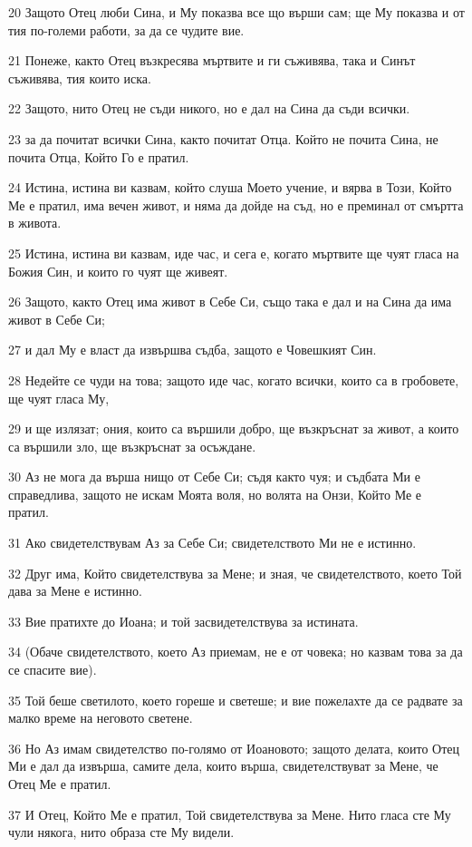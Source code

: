 \par 20 Защото Отец люби Сина, и Му показва все що върши сам; ще Му показва и от тия по-големи работи, за да се чудите вие.
\par 21 Понеже, както Отец възкресява мъртвите и ги съживява, така и Синът съживява, тия които иска.
\par 22 Защото, нито Отец не съди никого, но е дал на Сина да съди всички.
\par 23 за да почитат всички Сина, както почитат Отца. Който не почита Сина, не почита Отца, Който Го е пратил.
\par 24 Истина, истина ви казвам, който слуша Моето учение, и вярва в Този, Който Ме е пратил, има вечен живот, и няма да дойде на съд, но е преминал от смъртта в живота.
\par 25 Истина, истина ви казвам, иде час, и сега е, когато мъртвите ще чуят гласа на Божия Син, и които го чуят ще живеят.
\par 26 Защото, както Отец има живот в Себе Си, също така е дал и на Сина да има живот в Себе Си;
\par 27 и дал Му е власт да извършва съдба, защото е Човешкият Син.
\par 28 Недейте се чуди на това; защото иде час, когато всички, които са в гробовете, ще чуят гласа Му,
\par 29 и ще излязат; ония, които са вършили добро, ще възкръснат за живот, а които са вършили зло, ще възкръснат за осъждане.
\par 30 Аз не мога да върша нищо от Себе Си; съдя както чуя; и съдбата Ми е справедлива, защото не искам Моята воля, но волята на Онзи, Който Ме е пратил.
\par 31 Ако свидетелствувам Аз за Себе Си; свидетелството Ми не е истинно.
\par 32 Друг има, Който свидетелствува за Мене; и зная, че свидетелството, което Той дава за Мене е истинно.
\par 33 Вие пратихте до Иоана; и той засвидетелствува за истината.
\par 34 (Обаче свидетелството, което Аз приемам, не е от човека; но казвам това за да се спасите вие).
\par 35 Той беше светилото, което гореше и светеше; и вие пожелахте да се радвате за малко време на неговото светене.
\par 36 Но Аз имам свидетелство по-голямо от Иоановото; защото делата, които Отец Ми е дал да извърша, самите дела, които върша, свидетелствуват за Мене, че Отец Ме е пратил.
\par 37 И Отец, Който Ме е пратил, Той свидетелствува за Мене. Нито гласа сте Му чули някога, нито образа сте Му видели.
